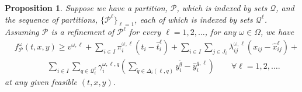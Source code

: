 \documentclass[11pt]{article}
\newtheorem{proposition}[theorem]{Proposition}
\begin{document}
	\begin{proposition} \label{prop:validity}
		Suppose we have a partition, \(\mathcal{P}\), which is indexed by sets \(\mathcal{Q}\), and the sequence of partitions, \(\{\mathcal{P}^\ell\}_{\ell = 1}\), each of which is indexed by sets \(\mathcal{Q}^\ell\). Assuming \(\mathcal{P}\) is a refinement of \(\mathcal{P}^\ell\) for every \(\ell = 1,2, \dots\), for any \(\omega \in \Omega\), we have
		\begin{align} \label{cons:validlb}
		&f^\omega_{\mathcal{P}}(t,x,y) \geq v^{\omega,\ell} + \sum_{i \in I} \pi_i^{\omega,\ell} (t_i - \hat{t}_i^{\ell}) + \sum_{i \in I} \sum_{j \in J_i} \lambda_{ij}^{\omega,\ell} (x_{ij} - \hat{x}_{ij}^{\ell}) + \nonumber \\ 
		& \qquad \qquad \sum_{i \in I} \sum_{q \in \mathcal{Q}^{\ell}_i} \gamma_{i}^{\omega,\ell,q} \left( \sum_{\tilde{q} \in \Delta_i(\ell,q)} y_i^{\tilde{q}} - \hat{y}_i^{q,\ell} \right) \qquad \forall \ell = 1,2, \dots. 
		\end{align}
		at any given feasible \((t,x,y)\).
	\end{proposition}
\end{document}
